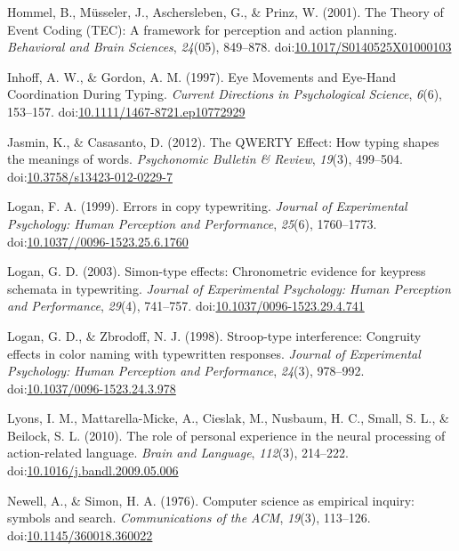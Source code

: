 \documentclass[english,man]{apa6}
\theoremstyle{definition}
\theoremstyle{definition}
\theoremstyle{definition}
\theoremstyle{remark}
\begin{document}
\hypertarget{ref-Hommel2001}{}
Hommel, B., Müsseler, J., Aschersleben, G., \& Prinz, W. (2001). The
Theory of Event Coding (TEC): A framework for perception and action
planning. \emph{Behavioral and Brain Sciences}, \emph{24}(05), 849--878.
doi:\href{https://doi.org/10.1017/S0140525X01000103}{10.1017/S0140525X01000103}

\hypertarget{ref-Inhoff1997}{}
Inhoff, A. W., \& Gordon, A. M. (1997). Eye Movements and Eye-Hand
Coordination During Typing. \emph{Current Directions in Psychological
Science}, \emph{6}(6), 153--157.
doi:\href{https://doi.org/10.1111/1467-8721.ep10772929}{10.1111/1467-8721.ep10772929}

\hypertarget{ref-Jasmin2012}{}
Jasmin, K., \& Casasanto, D. (2012). The QWERTY Effect: How typing
shapes the meanings of words. \emph{Psychonomic Bulletin \& Review},
\emph{19}(3), 499--504.
doi:\href{https://doi.org/10.3758/s13423-012-0229-7}{10.3758/s13423-012-0229-7}

\hypertarget{ref-Logan1999}{}
Logan, F. A. (1999). Errors in copy typewriting. \emph{Journal of
Experimental Psychology: Human Perception and Performance},
\emph{25}(6), 1760--1773.
doi:\href{https://doi.org/10.1037//0096-1523.25.6.1760}{10.1037//0096-1523.25.6.1760}

\hypertarget{ref-Logan2003}{}
Logan, G. D. (2003). Simon-type effects: Chronometric evidence for
keypress schemata in typewriting. \emph{Journal of Experimental
Psychology: Human Perception and Performance}, \emph{29}(4), 741--757.
doi:\href{https://doi.org/10.1037/0096-1523.29.4.741}{10.1037/0096-1523.29.4.741}

\hypertarget{ref-Logan1998}{}
Logan, G. D., \& Zbrodoff, N. J. (1998). Stroop-type interference:
Congruity effects in color naming with typewritten responses.
\emph{Journal of Experimental Psychology: Human Perception and
Performance}, \emph{24}(3), 978--992.
doi:\href{https://doi.org/10.1037/0096-1523.24.3.978}{10.1037/0096-1523.24.3.978}

\hypertarget{ref-Lyons2010}{}
Lyons, I. M., Mattarella-Micke, A., Cieslak, M., Nusbaum, H. C., Small,
S. L., \& Beilock, S. L. (2010). The role of personal experience in the
neural processing of action-related language. \emph{Brain and Language},
\emph{112}(3), 214--222.
doi:\href{https://doi.org/10.1016/j.bandl.2009.05.006}{10.1016/j.bandl.2009.05.006}

\hypertarget{ref-Newell1976}{}
Newell, A., \& Simon, H. A. (1976). Computer science as empirical
inquiry: symbols and search. \emph{Communications of the ACM},
\emph{19}(3), 113--126.
doi:\href{https://doi.org/10.1145/360018.360022}{10.1145/360018.360022}
\end{document}
